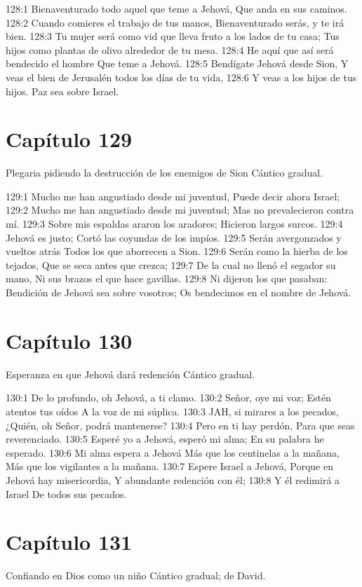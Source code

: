 128:1 Bienaventurado todo aquel que teme a Jehová, 
Que anda en sus caminos. 
128:2 Cuando comieres el trabajo de tus manos, 
Bienaventurado serás, y te irá bien. 
128:3 Tu mujer será como vid que lleva fruto a los lados de tu casa; 
Tus hijos como plantas de olivo alrededor de tu mesa. 
128:4 He aquí que así será bendecido el hombre 
Que teme a Jehová. 
128:5 Bendígate Jehová desde Sion, 
Y veas el bien de Jerusalén todos los días de tu vida, 
128:6 Y veas a los hijos de tus hijos. 
Paz sea sobre Israel. 
\section*{Capítulo 129}
Plegaria pidiendo la destrucción de los enemigos de Sion 
Cántico gradual. 
 
129:1 Mucho me han angustiado desde mi juventud, 
Puede decir ahora Israel; 
129:2 Mucho me han angustiado desde mi juventud; 
Mas no prevalecieron contra mí. 
129:3 Sobre mis espaldas araron los aradores; 
Hicieron largos surcos. 
129:4 Jehová es justo; 
Cortó las coyundas de los impíos. 
129:5 Serán avergonzados y vueltos atrás 
Todos los que aborrecen a Sion. 
129:6 Serán como la hierba de los tejados, 
Que se seca antes que crezca; 
129:7 De la cual no llenó el segador su mano, 
Ni sus brazos el que hace gavillas. 
129:8 Ni dijeron los que pasaban: 
Bendición de Jehová sea sobre vosotros; 
Os bendecimos en el nombre de Jehová. 
\section*{Capítulo 130}
Esperanza en que Jehová dará redención 
Cántico gradual. 
 
130:1 De lo profundo, oh Jehová, a ti clamo. 
130:2 Señor, oye mi voz; 
Estén atentos tus oídos 
A la voz de mi súplica. 
130:3 JAH, si mirares a los pecados, 
¿Quién, oh Señor, podrá mantenerse? 
130:4 Pero en ti hay perdón, 
Para que seas reverenciado. 
130:5 Esperé yo a Jehová, esperó mi alma; 
En su palabra he esperado. 
130:6 Mi alma espera a Jehová 
Más que los centinelas a la mañana, 
Más que los vigilantes a la mañana. 
130:7 Espere Israel a Jehová, 
Porque en Jehová hay misericordia, 
Y abundante redención con él; 
130:8 Y él redimirá a Israel 
De todos sus pecados. 
\section*{Capítulo 131}
Confiando en Dios como un niño 
Cántico gradual; de David. 
 
